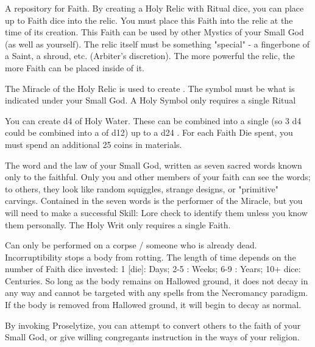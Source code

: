 {A repository for Faith.  By creating a Holy Relic with \DICE Ritual dice, you can place up to \DICE Faith dice into the relic.  You must place this Faith into the relic at the time of its creation.  This Faith can be used by other Mystics of your Small God (as well as yourself).  The relic itself must be something "special" - a fingerbone of a Saint, a shroud, etc.  (Arbiter's discretion).  The more powerful the relic, the more Faith can be placed inside of it.

The Miracle of the Holy Relic is used to create .  The symbol must be what is indicated under your Small God.  A Holy Symbol only requires a single Ritual \DICE



You can create \DICE d4 \UD of Holy Water.  These \UD can be combined into a single \UD (so 3 d4 \UD could be combined into a \UD of d12) up to a d24 \UD.  For each Faith Die spent, you must spend an additional 25 coins in materials.


The word and the law of your Small God, written as seven sacred words known only to the faithful.  Only you and other members of your faith can see the words; to others, they look like random squiggles, strange designs, or "primitive" carvings.  Contained in the seven words is the performer of the Miracle, but you will need to make a successful Skill: Lore check to identify them unless you know them personally.   The Holy Writ only requires a single Faith.




Can only be performed on a corpse / someone who is already dead.  Incorruptibility stops a body from rotting.  The length of time depends on the number of Faith dice invested:  1 [die]: \SUMDICE Days; 2-5 \DICE: \SUMDICE Weeks; 6-9 \DICE: \SUMDICE Years; 10+ dice: \SUMDICE Centuries.  So long as the body remains on Hallowed ground, it does not decay in any way and cannot be targeted with any spells from the Necromancy paradigm.  If the body is removed from Hallowed ground, it will begin to decay as normal.


By invoking Proselytize, you can attempt to convert others to the faith of your Small God, or give willing congregants instruction in the ways of your religion.  

}
